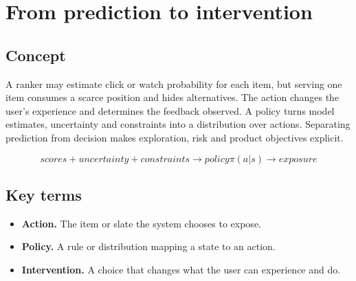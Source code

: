 \section{From prediction to intervention}

\begin{abstract}
The system does not only estimate behavior — it chooses the exposure that can cause it.
\end{abstract}

\subsection{Concept}
A ranker may estimate click or watch probability for each item, but serving one item consumes a scarce position and hides alternatives. The action changes the user’s experience and determines the feedback observed. A policy turns model estimates, uncertainty and constraints into a distribution over actions. Separating prediction from decision makes exploration, risk and product objectives explicit.

\begin{equation*}
scores + uncertainty + constraints  \rightarrow  policy π(a | s)  \rightarrow  exposure
\end{equation*}

\subsection{Key terms}
\begin{itemize}
\item \textbf{Action.} The item or slate the system chooses to expose.
\item \textbf{Policy.} A rule or distribution mapping a state to an action.
\item \textbf{Intervention.} A choice that changes what the user can experience and do.
\end{itemize}
